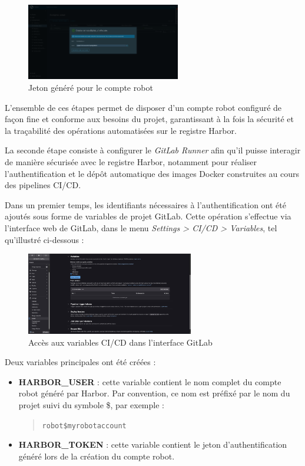 \begin{figure}[H]
	\centering
	\includegraphics[width=0.6\textwidth]{figures/harbor robot account jeton.png}
	\caption{Jeton généré pour le compte robot}
\end{figure}

L’ensemble de ces étapes permet de disposer d’un compte robot configuré de façon fine et conforme aux besoins du projet, garantissant à la fois la sécurité et la traçabilité des opérations automatisées sur le registre Harbor.

La seconde étape consiste à configurer le \emph{GitLab Runner} afin qu’il puisse interagir de manière sécurisée avec le registre Harbor, notamment pour réaliser l’authentification et le dépôt automatique des images Docker construites au cours des pipelines CI/CD.

Dans un premier temps, les identifiants nécessaires à l’authentification ont été ajoutés sous forme de variables de projet GitLab. Cette opération s’effectue via l’interface web de GitLab, dans le menu \emph{Settings > CI/CD > Variables}, tel qu’illustré ci-dessous :

\begin{figure}[H]
	\centering
	\includegraphics[width=0.65\textwidth]{figures/gitlab variables menu.png}
	\caption{Accès aux variables CI/CD dans l’interface GitLab}
\end{figure}

Deux variables principales ont été créées :

\begin{itemize}
	\item \textbf{HARBOR\_USER} : cette variable contient le nom complet du compte robot généré par Harbor. Par convention, ce nom est préfixé par le nom du projet suivi du symbole \$, par exemple :
	      \begin{quote}
		      \texttt{robot\$myrobotaccount}
	      \end{quote}
	\item \textbf{HARBOR\_TOKEN} : cette variable contient le jeton d’authentification généré lors de la création du compte robot.
\end{itemize}

